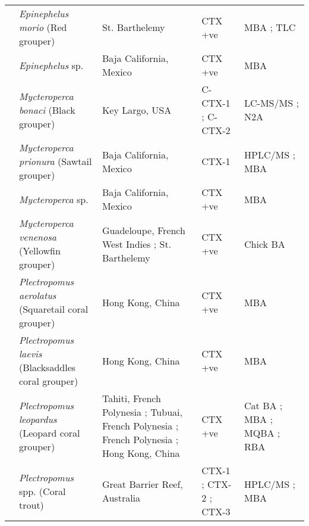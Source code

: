 \documentclass[12pt]{article}
\begin{document}
\begin{longtable}{  | p{2cm} | p{3cm} | p{4.5cm}  | p{2cm} | p{3cm}  | }
  & \emph{Epinephelus morio} (Red grouper) & St. Barthelemy \cite{vernoux1986heterogeneity} & CTX +ve\cite{vernoux1986heterogeneity} & MBA \cite{vernoux1986heterogeneity}; TLC \cite{vernoux1986heterogeneity} \\
  &  \emph{Epinephelus} sp. & Baja California, Mexico \cite{lechuga1995documented} & CTX +ve \cite{lechuga1995documented} & MBA \cite{lechuga1995documented} \\
  & \emph{Mycteroperca bonaci}  (Black grouper) & Key Largo, USA  \cite{dickey2008ciguatera} & C-CTX-1 \cite{dickey2008ciguatera}; C-CTX-2 \cite{dickey2008ciguatera} & LC-MS/MS \cite{dickey2008ciguatera}; N2A \cite{dickey2008ciguatera} \\
  & \emph{Mycteroperca prionura} (Sawtail grouper) & Baja California, Mexico \cite{sierra1998overview} & CTX-1 \cite{sierra1998overview} & HPLC/MS \cite{sierra1998overview}; MBA \cite{sierra1998overview} \\
  &  \emph{Mycteroperca} sp. & Baja California, Mexico \cite{lechuga1995documented} & CTX +ve \cite{lechuga1995documented} & MBA \cite{lechuga1995documented} \\
  & \emph{Mycteroperca venenosa}  (Yellowfin grouper) & Guadeloupe, French West Indies \cite{}; St. Barthelemy \cite{} & CTX +ve \cite{} & Chick BA \cite{}\\
  & \emph{Plectropomus aerolatus} (Squaretail coral grouper) & Hong Kong, China \cite{wong2005study} & CTX +ve \cite{wong2005study} & MBA \cite{wong2005study} \\
  &  \emph{Plectropomus laevis} (Blacksaddles coral grouper) & Hong Kong, China \cite{wong2008features} & CTX +ve \cite{wong2008features} & MBA \cite{wong2008features}\\
  & \emph{Plectropomus leopardus}  (Leopard coral grouper) & Tahiti, French Polynesia \cite{pompon1983ciguatera}; Tubuai, French Polynesia \cite{darius2007ciguatera}; French Polynesia \cite{bagnis1987use}; Hong Kong, China \cite{wong2005study} & CTX +ve \cite{wong2005study,darius2007ciguatera,bagnis1987use,pompon1983ciguatera} & Cat BA \cite{bagnis1987use}; MBA \cite{wong2005study,bagnis1987use,pompon1983ciguatera}; MQBA \cite{bagnis1987use}; RBA \cite{darius2007ciguatera} \\
  & \emph{Plectropomus} spp. (Coral trout) & Great Barrier Reef, Australia \cite{lewis1992multiple} & CTX-1 \cite{lewis1992multiple}; CTX-2 \cite{lewis1992multiple}; CTX-3 \cite{lewis1992multiple} & HPLC/MS \cite{lewis1992multiple}; MBA \cite{lewis1992multiple} \\

\end{longtable}
\end{document}
